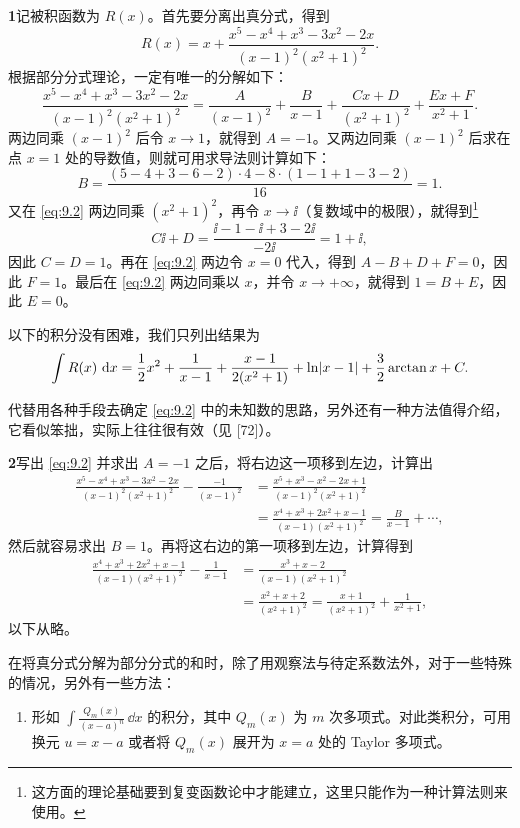 \begin{xsolution}
\textbf{1}\quad 记被积函数为 $R(x)$。首先要分离出真分式，得到
\[
  R(x)=x+\frac{x^5-x^4+x^3-3x^2-2x}{(x-1)^2(x^2+1)^2}.
\]
根据部分分式理论，一定有唯一的分解如下：
\begin{equation}
  \frac{x^5-x^4+x^3-3x^2-2x}{(x-1)^2(x^2+1)^2}
  =\frac{A}{(x-1)^2}+\frac{B}{x-1}
   +\frac{Cx+D}{(x^2+1)^2}+\frac{Ex+F}{x^2+1}.
  \tag{9.2}
  \label{eq:9.2}
\end{equation}
两边同乘 $(x-1)^2$ 后令 $x\to1$，就得到 $A=-1$。又两边同乘 $(x-1)^2$ 后求在点 $x=1$ 处的导数值，则就可用求导法则计算如下：
\[
  B=\frac{(5-4+3-6-2)\cdot4-8\cdot(1-1+1-3-2)}{16}=1.
\]
又在 \eqref{eq:9.2} 两边同乘 $(x^2+1)^2$，再令 $x\to\ii$（复数域中的极限），就得到\footnote{这方面的理论基础要到复变函数论中才能建立，这里只能作为一种计算法则来使用。}
\[
  C\ii+D=\frac{\ii-1-\ii+3-2\ii}{-2\ii}=1+\ii,
\]
因此 $C=D=1$。再在 \eqref{eq:9.2} 两边令 $x=0$ 代入，得到 $A-B+D+F=0$，因此 $F=1$。最后在 \eqref{eq:9.2} 两边同乘以 $x$，并令 $x\to+\infty$，就得到 $1=B+E$，因此 $E=0$。

以下的积分没有困难，我们只列出结果为
\[
  \int R(x)\,\mathop{}\!\mathrm{d} x
  =\frac12x^2+\frac1{x-1}+\frac{x-1}{2(x^2+1)}+\ln\lvert x-1\rvert+\frac32\arctan x+C.
\]

代替用各种手段去确定 \eqref{eq:9.2} 中的未知数的思路，另外还有一种方法值得介绍，它看似笨拙，实际上往往很有效（见 [72]）。
\end{xsolution}

\begin{xsolution}
\textbf{2}\quad 写出 \eqref{eq:9.2} 并求出 $A=-1$ 之后，将右边这一项移到左边，计算出
\begin{align*}
  \frac{x^5-x^4+x^3-3x^2-2x}{(x-1)^2(x^2+1)^2}-\frac{-1}{(x-1)^2}
  &=\frac{x^5+x^3-x^2-2x+1}{(x-1)^2(x^2+1)^2}\\
  &=\frac{x^4+x^3+2x^2+x-1}{(x-1)(x^2+1)^2}
   =\frac{B}{x-1}+\cdots,
\end{align*}
然后就容易求出 $B=1$。再将这右边的第一项移到左边，计算得到
\begin{align*}
  \frac{x^4+x^3+2x^2+x-1}{(x-1)(x^2+1)^2}-\frac1{x-1}
  &=\frac{x^3+x-2}{(x-1)(x^2+1)^2}\\
  &=\frac{x^2+x+2}{(x^2+1)^2}
   =\frac{x+1}{(x^2+1)^2}+\frac1{x^2+1},
\end{align*}
以下从略。
\end{xsolution}

在将真分式分解为部分分式的和时，除了用观察法与待定系数法外，对于一些特殊的情况，另外有一些方法：

\begin{enumerate}
  \item 形如 $\displaystyle\int\frac{Q_m(x)}{(x-a)^n}\,\dd x$ 的积分，其中 $Q_m(x)$ 为 $m$ 次多项式。对此类积分，可用换元 $u=x-a$ 或者将 $Q_m(x)$ 展开为 $x=a$ 处的 Taylor 多项式。
\end{enumerate}

